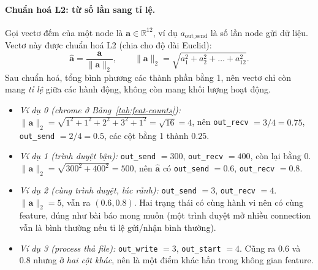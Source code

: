 \paragraph{Chuẩn hoá L2: từ số lần sang tỉ lệ.}
Gọi vectơ đếm của một node là $\mathbf{a} \in \mathbb{R}^{12}$, ví dụ $a_{\text{out\_send}}$ là số lần node gửi dữ liệu. Vectơ này được chuẩn hoá L2 (chia cho độ dài Euclid):
\[
\hat{\mathbf{a}} = \frac{\mathbf{a}}{\|\mathbf{a}\|_2}, \qquad \|\mathbf{a}\|_2 = \sqrt{a_1^2 + a_2^2 + \dots + a_{12}^2}.
\]
Sau chuẩn hoá, tổng bình phương các thành phần bằng 1, nên vectơ chỉ còn mang \emph{tỉ lệ} giữa các hành động, không còn mang khối lượng hoạt động.
\begin{itemize}
    \item \emph{Ví dụ 0 (chrome ở Bảng~\ref{tab:feat-counts}):} $\|\mathbf{a}\|_2 = \sqrt{1^2 + 1^2 + 2^2 + 3^2 + 1^2} = \sqrt{16} = 4$, nên \texttt{out\_recv} $= 3/4 = 0.75$, \texttt{out\_send} $= 2/4 = 0.5$, các cột bằng 1 thành $0.25$.
    \item \emph{Ví dụ 1 (trình duyệt bận):} \texttt{out\_send} $= 300$, \texttt{out\_recv} $= 400$, còn lại bằng 0. $\|\mathbf{a}\|_2 = \sqrt{300^2 + 400^2} = 500$, nên $\hat{\mathbf{a}}$ có \texttt{out\_send} $= 0.6$, \texttt{out\_recv} $= 0.8$.
    \item \emph{Ví dụ 2 (cùng trình duyệt, lúc rảnh):} \texttt{out\_send} $= 3$, \texttt{out\_recv} $= 4$. $\|\mathbf{a}\|_2 = 5$, vẫn ra $(0.6, 0.8)$. Hai trạng thái có cùng hành vi nên có cùng feature, đúng như bài báo mong muốn (một trình duyệt mở nhiều connection vẫn là bình thường nếu tỉ lệ gửi/nhận bình thường).
    \item \emph{Ví dụ 3 (process thả file):} \texttt{out\_write} $= 3$, \texttt{out\_start} $= 4$. Cũng ra $0.6$ và $0.8$ nhưng ở \emph{hai cột khác}, nên là một điểm khác hẳn trong không gian feature.
\end{itemize}


